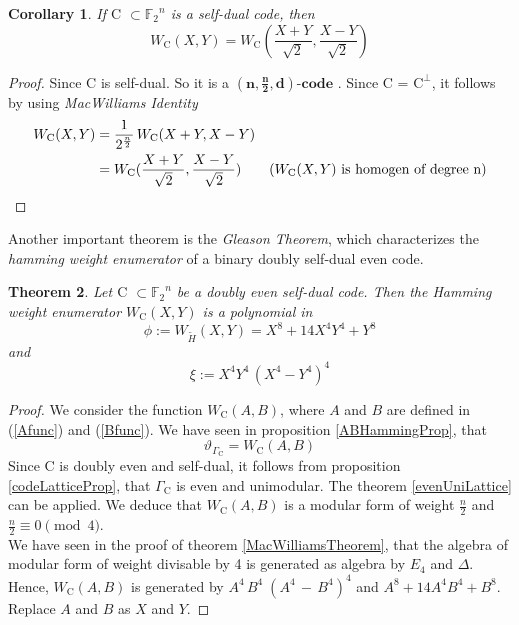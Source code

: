 \documentclass{article}
\newtheorem{theorem}{Theorem}[section]
\newtheorem{collary}[theorem]{Corollary}
\numberwithin{equation}{theorem}
\numberwithin{figure}{theorem}
\newcommand{\Ftwo}{\ensuremath{\mathbb{F}_2}}
\newcommand{\simpleCodes}{\ensuremath{\mathrm{C}}}
\newcommand{\buildVertical}[1]{\ensuremath{#1^{\bot}}}
\newcommand{\buildLattice}[1]{\ensuremath{\Gamma_{#1}}}
\newcommand{\weightEnumerator}[3]{\ensuremath{W_{#1}(#2,#3)}}
\newcommand{\thetaFunction}[1]{\ensuremath{\vartheta_{#1}}}
\newcommand{\linearCode}[3]{\ensuremath{\bm{(#1,#2,#3)\mbox{-}code}}}
\newcommand{\polyAB}[2]{\ensuremath{#1^4#2^4\,(#1^4 - #2^4)^4}}
\newcommand{\twoFourDegreeAB}{\ensuremath{A^4\,B^4\;(A^4 \,-\, B^4)^4}}
\begin{document}
\begin{collary}\label{macWilliamsSelfDualCoroll}
If {\simpleCodes} $\subset \Ftwo^n$ is a self-dual code, then 
\[
	\weightEnumerator{\simpleCodes}{X}{Y} = \weightEnumerator{\simpleCodes}{\frac{X + Y}{\sqrt{2}}}{\frac{X - Y}{\sqrt{2}}}
\]
\end{collary}
\begin{proof}
Since {\simpleCodes} is self-dual. So it is a {\linearCode{n}{\frac{n}{2}}{d}} . Since {\simpleCodes} = {\buildVertical{\simpleCodes}}, it follows by using \emph{MacWilliams Identity}
\begin{align*}
	\weightEnumerator{\simpleCodes}{X}{Y} &= \frac{1}{2^{\frac{n}{2}}} \, \weightEnumerator{\simpleCodes}{X+Y}{X-Y} \\
	&= \weightEnumerator{\simpleCodes}{\frac{X+Y}{\sqrt{2}}}{\frac{X-Y}{\sqrt{2}}} \tag{\weightEnumerator{\simpleCodes}{X}{Y} is homogen of degree n}
\end{align*}
\end{proof}
Another important theorem is the \emph{Gleason Theorem}, which characterizes the \emph{hamming weight enumerator} of a binary doubly self-dual even code.
\begin{theorem}\label{GleasonTheorem}
Let {\simpleCodes} $\subset \Ftwo^n$ be a doubly even self-dual code. Then the \emph{Hamming weight enumerator} {\weightEnumerator{\simpleCodes}{X}{Y}} is a polynomial in
\[
	\phi := \weightEnumerator{\widetilde{H}}{X}{Y} = X^8 + 14X^4Y^4 + Y^8
\]  
and
\[
	\xi := \polyAB{X}{Y}
\]
\end{theorem}
\begin{proof}
We consider the function \weightEnumerator{\simpleCodes}{A}{B}, where $A$ and $B$ are defined in (\ref{Afunc}) and (\ref{Bfunc}). We have seen in proposition \ref{ABHammingProp}, that 
\[
	\thetaFunction{\buildLattice{\simpleCodes}} = \weightEnumerator{\simpleCodes}{A}{B}
\]
Since {\simpleCodes} is doubly even and self-dual, it follows from proposition \ref{codeLatticeProp}, that $\buildLattice{\simpleCodes}$ is even and unimodular. The theorem \ref{evenUniLattice} can be applied. We deduce that {\weightEnumerator{\simpleCodes}{A}{B}} is a modular form of weight $\frac{n}{2}$ and $\frac{n}{2} \equiv 0 \pmod 4$.\\
We have seen in the proof of theorem \ref{MacWilliamsTheorem}, that the algebra of modular form of weight divisable by 4 is generated as algebra by $E_4$ and $\Delta$. Hence, {\weightEnumerator{\simpleCodes}{A}{B}} is generated by $\twoFourDegreeAB$ and $A^8 + 14A^4B^4 + B^8$. Replace $A$ and $B$ as $X$ and $Y$.
\end{proof}
\end{document}
